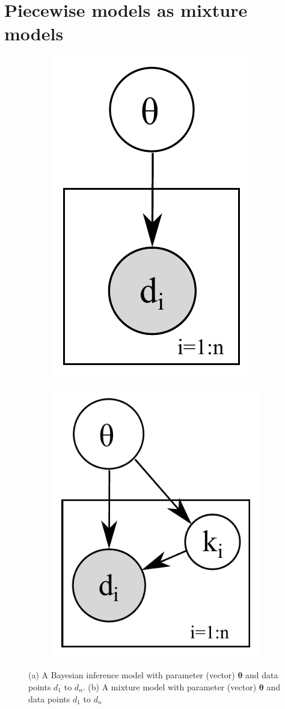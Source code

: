 \section{Piecewise models as mixture models}
\label{sect:mix}

\begin{figure}
\centering
\begin{subfigure}{.48\linewidth}
\centering
\includegraphics[width=.56\textwidth]{pic/naive.pdf}
\caption{}
\label{fig:naive}
\end{subfigure}
\begin{subfigure}{.48\linewidth}
\centering
  \includegraphics[width=.70\textwidth]{pic/naive-mix2.pdf}
\caption{}
\label{fig:naive.mix}
\end{subfigure}
\caption{\footnotesize 
(a) A Bayesian inference model with parameter (vector) $\boldsymbol\theta$ and data points $d_1$ to $d_n$.
(b) A mixture model with parameter (vector) $\boldsymbol\theta$ and data points $d_1$ to $d_n$ 
}
\end{figure}

